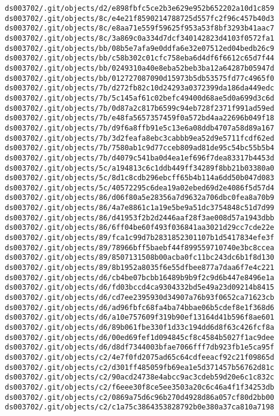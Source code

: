 \documentclass[11pt]{article}
\begin{document}
\begin{Verbatim}[commandchars=\\\{\}]
ds003702/.git/objects/d2/e898fbfc5ce2b3e629e952b652202a10d1c859
ds003702/.git/objects/8c/e4e21f8590214788725d557fc2f96c457b40d3
ds003702/.git/objects/8c/e8aa71e559f59625f953a53f8bf3293b41aac7
ds003702/.git/objects/8c/3a869c0a334d7dcf340142823d4103f0572fa1
ds003702/.git/objects/bb/08b5e7afa9e0ddfa6e32e07512ed04bedb26c9
ds003702/.git/objects/bb/c58b302c01cfc758eba6d4df6f6612c65d7f44
ds003702/.git/objects/bb/0249310a40e8eba52beb3ba12a64287b05947d
ds003702/.git/objects/bb/012727087090d15973b5db53575fd77c4965f0
ds003702/.git/objects/7b/d272fb82c10d24293a0372399da186da449edc
ds003702/.git/objects/7b/5c145af61c02befc49400d68ae5d0a699d3c6d
ds003702/.git/objects/7b/0d87a2c817b6599c94eb728f2371f991ad59ed
ds003702/.git/objects/7b/e48fa5657357459f0a572bd4aa22696b049f18
ds003702/.git/objects/7b/d9f6a8ffb91e5c13e6a08ddb4707a58d89a167
ds003702/.git/objects/7b/3d2feafa8ebc3cabbb9ea52d9e5711fcdf62ed
ds003702/.git/objects/7b/7580ab1c9d77cceb809ad81de95c54bc55b5b4
ds003702/.git/objects/7b/d4079c541ba0d4ea1ef696f7dea83317b4453d
ds003702/.git/objects/5c/a194813c6c1ddb449ff34289f8bb21b03380a0
ds003702/.git/objects/5c/8d1c8cdb296ebcff65b4b114a6dd50b047d083
ds003702/.git/objects/5c/40572295c6dea19a02ebed69d2e4086f5d57d4
ds003702/.git/objects/86/d06f80a5e28356a7d9632a706dbc0fea8a70b9
ds003702/.git/objects/86/4a7e8861c1a19e5be9a51dc3754848c51d7d99
ds003702/.git/objects/86/d41953f2b2d2446aaf28f3ae008d57a1943dbb
ds003702/.git/objects/86/6ff04be60f493f036841aa3021d29cc7cde22e
ds003702/.git/objects/89/fca1c99d7b2831852301107b1d5417834efe3f
ds003702/.git/objects/89/78966bff5baebf44f899559710740e3bc8ccea
ds003702/.git/objects/89/8507131508b00acba0fc11bc243dc6b1f8d130
ds003702/.git/objects/89/8b1952a8035f6e55dfbee877a7daa6f7e4c221
ds003702/.git/objects/d6/cb4be07bcbb16489b9b9f2c9d6b447e8496e1a
ds003702/.git/objects/d6/fd03bccd4ca9304332bd5e49a23d09214b8415
ds003702/.git/objects/d6/cd7ee2395930d34907a76b93f0652ca71623cb
ds003702/.git/objects/d6/ad96fbfc68fa4ba74bbae06b5cdef8e1f368d6
ds003702/.git/objects/d6/a10e757609f319b90ef13164d41b596f8ae601
ds003702/.git/objects/d6/89b061fbe330f1d33c194dd6d8f63c426fcf8a
ds003702/.git/objects/d6/00ed69fef1d094845cf8c4584b5027f1ac9dee
ds003702/.git/objects/d6/d8df7344003bfae7066fff7db923fb1e5ca95f
ds003702/.git/objects/c2/4e7f0fd2075ad65c64cdfeeacf92c21f09865d
ds003702/.git/objects/c2/d301ff485059fb69ea1e5d371457b56762d81c
ds003702/.git/objects/c2/90acd24738e4abcc9ac3cdeb59d20e6c1c832c
ds003702/.git/objects/c2/f6eee30f8ce5ee3503a20c6c46a4f1f34253db
ds003702/.git/objects/c2/0869a75d6c96b270d4928d86a057cf80d2bb00
ds003702/.git/objects/c2/c1a75c3864353828792b0e380a37ca810a7198

\end{Verbatim}
\end{document}
